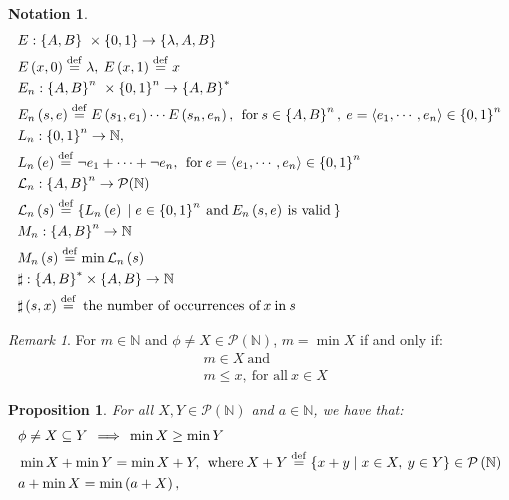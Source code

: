 \documentclass[a4paper,9pt,leqno]{article}
\renewcommand{\=}{\protect\nobreakdash-\hspace{0pt}}
\renewcommand{\~}{\protect\nobreakdash--\hspace{0pt}}
\theoremstyle{plain}
\newtheorem{proposition}[fact]{Proposition}
\theoremstyle{definition}
\newtheorem{notation}[fact]{Notation}
\theoremstyle{remark}
\newtheorem{remark}[fact]{Remark}
\newcommand{\impll}{\:\:\Longrightarrow\:\:}
\newcommand{\impl}{\impll}%
\newcommand{\by}[1]{{#1}}
\newcommand{\bydef}{\by{def}}
\newcommand{\symby}[2]{\stackrel{#1}{{#2}}}
\newcommand{\symbyrm}[2]{\symby{{\rm\scriptstyle{#1}}}{#2}}
\newcommand{\eqby}[1]{\symbyrm{#1}{=}}
\newcommand{\eqbydef}{\eqby{\bydef}}
\newcommand{\set}[2]{\lc #1 \thickspace|\thickspace #2 \rc}
\newcommand{\txt}[1]{\:\text{#1}\:}
\newcommand{\mc}{,\:}
\newcommand{\lp}{\left(}
\newcommand{\lc}{\left\{}
\newcommand{\rp}{\right)}
\newcommand{\rc}{\right\}}
\newcommand{\la}{\left\langle}
\newcommand{\ra}{\right\rangle}
\newcommand\Nat{\mathbb{N}}
\newcommand\Nat*{\mathbb{N}^*}
\begin{document}
\begin{notation}

\begin{align}
& E : \lc A, B \rc \ \times \lc 0, 1 \rc \to \lc \lambda, A, B \rc \label{defE} \\
%
& E \lp x, 0 \rp \eqbydef \lambda\mc 
  E \lp x, 1 \rp \eqbydef x \nonumber \\
%
&  E_n : \lc A, B \rc^n \ \times \lc 0, 1 \rc^n \to \lc A, B \rc^\ast \label{defEn} \\
%
&  E_n \lp s, e \rp \eqbydef E \lp s_1, e_1 \rp \cdots E \lp s_n, e_n \rp\mc\txt{for}
   s \in \lc A, B \rc^n\mc
   e = \la e_1, \cdots, e_n\ra \in \lc 0, 1 \rc^n \nonumber \\
%
& L_n : \lc 0, 1 \rc^n \to \Nat\mc \label{defLn} \\
%
& L_n \lp e \rp \eqbydef \neg e_1 + \cdots + \neg e_n\mc\txt{for}
  e = \la e_1, \cdots, e_n\ra \in \lc 0, 1 \rc^n \nonumber \\
%
& \mathcal{L}_n : \lc A, B \rc^n \to \mathcal{P}(\Nat) \label{defLLn}\\
%
& \mathcal{L}_n \lp s \rp \eqbydef \set{L_n\lp e\rp}{e \in \lc 0, 1\rc^n
    \txt{and} E_n \lp s, e \rp \txt{is valid}} \nonumber \\
%
& M_n : \lc A, B \rc^n \to \Nat \label{defMn} \\
%
& M_n \lp s \rp \eqbydef \min\mathcal{L}_n\lp s\rp \nonumber \\
%
& \sharp : \lc A, B \rc^\ast \times \lc A, B \rc \to \Nat \label{defsharp} \\
%
& \sharp\lp s, x\rp \eqbydef \txt{the number of occurrences of} x \txt{in} s \nonumber
\end{align}

\end{notation}

\begin{remark}
For $m \in\Nat$ and $\phi \ne X \in \mathcal{P}\lp\Nat\rp$,
$m = \min X$ if and only if:
\begin{align}
& m \in X \label{minin} \txt{and} \\
& m \le x, \txt{for all} x \in X \label{minle}
\end{align}
\end{remark}

\begin{proposition}
For all $X, Y \in \mathcal{P}\lp\Nat\rp$ and $a \in \Nat$, we have that:
%
\begin{align}
& \phi \ne X \subseteq Y \impl \min X \ge \min Y \label{minXgeY} \\
& \min X + \min Y = \min X + Y\mc \label{minXplusY}
  \txt{where} X + Y \eqbydef \set{x + y}{x \in X\mc y \in Y} \in \mathcal{P}\lp\Nat\rp \\
& a + \min X = \min \lp a + X\rp\mc \label{minaplusX}
\end{align}
\end{proposition}
\end{document}
